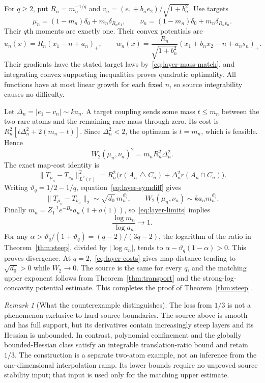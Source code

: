\documentclass[11pt]{article}
\theoremstyle{remark}\newtheorem{remark}[theorem]{Remark}
\newcommand{\norm}[1]{\lVert#1\rVert}\newcommand{\ind}{\mathbf 1}
\begin{document}
For $q\ge2$, put $R_n=m_n^{-1/q}$ and
$v_n=(e_1+b_ne_2)/\sqrt{1+b_n^2}$. Use targets
\[
 \mu_n=(1-m_n)\delta_0+m_n\delta_{R_ne_1},\qquad
 \nu_n=(1-m_n)\delta_0+m_n\delta_{R_nv_n}.
\]
Their $q$th moments are exactly one. Their convex potentials are
\[
 u_n(x)=R_n(x_1-n+a_n)_+,\qquad
 w_n(x)=\frac{R_n}{\sqrt{1+b_n^2}}
             (x_1+b_nx_2-n+a_ns_n)_+.
\]
Their gradients have the stated target laws by~\eqref{eq:layer-mass-match}, and integrating convex supporting inequalities proves quadratic optimality. All functions have at most linear growth for each fixed $n$, so source integrability causes no difficulty.

Let $\Delta_n=|e_1-v_n|\sim ka_n$. A target coupling sends some mass $t\le m_n$ between the two rare atoms and the remaining rare mass through zero. Its cost is
$R_n^2[t\Delta_n^2+2(m_n-t)]$. Since $\Delta_n^2<2$, the optimum is $t=m_n$, which is feasible. Hence
\[
 W_2(\mu_n,\nu_n)^2=m_nR_n^2\Delta_n^2.
\]
The exact map-cost identity is
\[
 \norm{T_{\mu_n}-T_{\nu_n}}_{L^2(r)}^2
 =R_n^2\bigl(r(A_n\mathbin\triangle C_n)
                  +\Delta_n^2r(A_n\cap C_n)\bigr).
\]
Writing $\vartheta_q=1/2-1/q$, equation~\eqref{eq:layer-symdiff} gives
\begin{equation}\label{eq:layer-costs}
 \norm{T_{\mu_n}-T_{\nu_n}}_2\sim\sqrt{d_0}\,m_n^{\vartheta_q},
 \qquad W_2(\mu_n,\nu_n)\sim k a_nm_n^{\vartheta_q}.
\end{equation}
Finally $m_n=Z_1^{-1}e^{-B_n}a_n(1+o(1))$, so~\eqref{eq:layer-limits} implies
\[
 \frac{\log m_n}{\log a_n}\longrightarrow1.
\]
For any $\alpha>\vartheta_q/(1+\vartheta_q)=(q-2)/(3q-2)$, the logarithm of the ratio in Theorem~\ref{thm:steep}, divided by $|\log a_n|$, tends to
$\alpha-\vartheta_q(1-\alpha)>0$. This proves divergence. At $q=2$,~\eqref{eq:layer-costs} gives map distance tending to $\sqrt{d_0}>0$ while $W_2\to0$. The source is the same for every $q$, and the matching upper exponent follows from Theorem~\ref{thm:transport} and the strong-log-concavity potential estimate. This completes the proof of Theorem~\ref{thm:steep}.

\begin{remark}[What the counterexample distinguishes]
The loss from $1/3$ is not a phenomenon exclusive to hard source boundaries. The source above is smooth and has full support, but its derivatives contain increasingly steep layers and its Hessian is unbounded. In contrast, polynomial confinement and the globally bounded-Hessian class satisfy an integrable translation-ratio bound and retain $1/3$. The construction is a separate two-atom example, not an inference from the one-dimensional interpolation ramp. Its lower bounds require no unproved source stability input; that input is used only for the matching upper estimate.
\end{remark}
\end{document}
